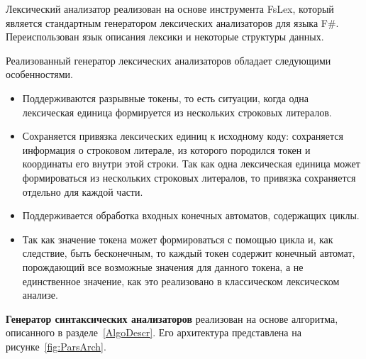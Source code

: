 Лексический анализатор реализован на основе инструмента FsLex, который является стандартным генератором лексических анализаторов для языка F\#. Переиспользован язык описания лексики и некоторые структуры данных.

Реализованный генератор лексических анализаторов обладает следующими особенностями.
\begin{itemize}
    \item Поддерживаются разрывные токены, то есть ситуации, когда одна лексическая единица формируется из нескольких строковых литералов.
    \item Сохраняется привязка лексических единиц к исходному коду: сохраняется информация о строковом литерале, из которого породился токен и координаты его внутри этой строки. Так как одна лексическая единица может формироваться из нескольких строковых литералов, то привязка сохраняется отдельно для каждой части.
    \item Поддерживается обработка входных конечных автоматов, содержащих циклы.
    \item Так как значение токена может формироваться с помощью цикла и, как следствие, быть бесконечным, то каждый токен содержит конечный автомат, порождающий все возможные значения для данного токена, а не единственное значение, как это реализовано в классическом лексическом анализе.
\end{itemize}

\textbf{Генератор синтаксических анализаторов} реализован на основе алгоритма, описанного в разделе~\ref{AlgoDescr}. Его архитектура представлена на рисунке~\ref{fig:ParsArch}.  


